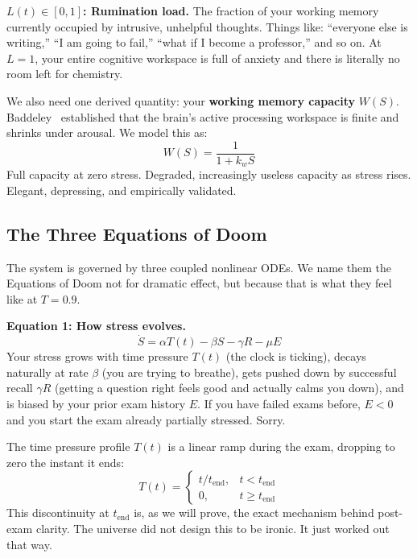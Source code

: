 \documentclass[11pt,a4paper]{article}
\begin{document}
\textbf{$L(t) \in [0,1]$: Rumination load.} The fraction of your
working memory currently occupied by intrusive, unhelpful thoughts.
Things like: ``everyone else is writing,'' ``I am going to fail,''
``what if I become a professor,'' and so on. At $L=1$, your entire
cognitive workspace is full of anxiety and there is literally no
room left for chemistry.

We also need one derived quantity: your \textbf{working memory
capacity} $W(S)$. Baddeley~\cite{baddeley1986} established that the
brain's active processing workspace is finite and shrinks under
arousal. We model this as:
\begin{equation}
  W(S) = \frac{1}{1 + k_w S}
  \label{eq:W}
\end{equation}
Full capacity at zero stress. Degraded, increasingly useless
capacity as stress rises. Elegant, depressing, and empirically
validated.

\subsection{The Three Equations of Doom}

The system is governed by three coupled nonlinear ODEs. We name
them the Equations of Doom not for dramatic effect, but because
that is what they feel like at $T = 0.9$.

\textbf{Equation 1: How stress evolves.}
\begin{equation}
  \dot{S} = \alpha T(t) - \beta S - \gamma R - \mu E
  \label{eq:S}
\end{equation}
Your stress grows with time pressure $T(t)$ (the clock is ticking),
decays naturally at rate $\beta$ (you are trying to breathe), gets
pushed down by successful recall $\gamma R$ (getting a question right
feels good and actually calms you down), and is biased by your
prior exam history $E$. If you have failed exams before, $E < 0$
and you start the exam already partially stressed. Sorry.

The time pressure profile $T(t)$ is a linear ramp during the exam,
dropping to zero the instant it ends:
\begin{equation}
  T(t) = \begin{cases} t/t_{\mathrm{end}}, & t < t_{\mathrm{end}} \\ 0, & t \geq t_{\mathrm{end}} \end{cases}
  \label{eq:T}
\end{equation}
This discontinuity at $t_{\mathrm{end}}$ is, as we will prove, the
exact mechanism behind post-exam clarity. The universe did not design
this to be ironic. It just worked out that way.
\end{document}
